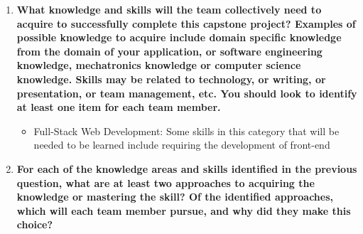 \begin{enumerate}
  \item \textbf{What knowledge and skills will the team collectively need to acquire to successfully complete this capstone project?  Examples of possible knowledge to acquire include domain specific knowledge from the domain of your application, or software engineering knowledge, mechatronics knowledge or computer science knowledge.  Skills may be related to technology, or writing, or presentation, or team management, etc. You should look to identify at least one item for each team member.}
  \begin{itemize}
    \item Full-Stack Web Development: Some skills in this category that will be needed to be learned include requiring the development of front-end  
  \end{itemize}
  \item \textbf{For each of the knowledge areas and skills identified in the previous question, what are at least two approaches to acquiring the knowledge or mastering the skill?  Of the identified approaches, which will each team member pursue, and why did they make this choice?}
\end{enumerate}
